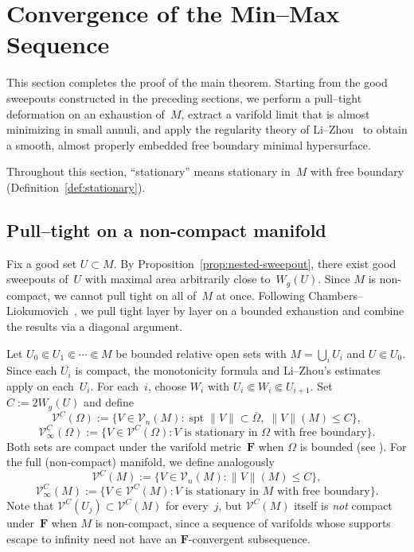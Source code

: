 \section{Convergence of the Min--Max Sequence}\label{ch:convergence-of-min-max}

This section completes the proof of the main theorem. Starting from the good sweepouts constructed in the preceding sections, we perform a pull--tight deformation on an exhaustion of~$M$, extract a varifold limit that is almost minimizing in small annuli, and apply the regularity theory of Li--Zhou~\cite{LZ17} to obtain a smooth, almost properly embedded free boundary minimal hypersurface.

Throughout this section, ``stationary'' means stationary in~$M$ with free boundary (Definition~\ref{def:stationary}).

\subsection{Pull--tight on a non-compact manifold}\label{sec:pull-tight}

Fix a good set $U\subset M$. By Proposition~\ref{prop:nested-sweepout}, there exist good sweepouts of~$U$ with maximal area arbitrarily close to~$W_g(U)$. Since $M$ is non-compact, we cannot pull tight on all of~$M$ at once. Following Chambers--Liokumovich~\cite[\S7]{CL20}, we pull tight layer by layer on a bounded exhaustion and combine the results via a diagonal argument.

Let $U_0\Subset U_1\Subset\cdots\Subset M$ be bounded relative open sets with $M=\bigcup_i U_i$ and $U\Subset U_0$. Since each $\overline{U_i}$ is compact, the monotonicity formula \cite[Theorem~2.1]{LZ17} and Li--Zhou's estimates \cite[Section~3]{LZ17} apply on each~$U_i$. For each~$i$, choose $W_i$ with $U_i\Subset W_i\Subset U_{i+1}$. Set $C:=2W_g(U)$ and define
\[
\mathcal{V}^C(\Omega):=\bigl\{V\in\mathcal{V}_n(M):\operatorname{spt}\|V\|\subset\overline\Omega,\;\|V\|(M)\le C\bigr\},
\]
\[
\mathcal{V}^C_\infty(\Omega):=\bigl\{V\in\mathcal{V}^C(\Omega): V\text{ is stationary in }\Omega\text{ with free boundary}\bigr\}.
\]
Both sets are compact under the varifold metric~$\mathbf{F}$ when $\Omega$ is bounded (see \cite[Lemma~3.4]{LZ17}). For the full (non-compact) manifold, we define analogously
\[
\mathcal{V}^C(M):=\bigl\{V\in\mathcal{V}_n(M): \|V\|(M)\le C\bigr\},
\]
\[
\mathcal{V}^C_\infty(M):=\bigl\{V\in\mathcal{V}^C(M): V\text{ is stationary in }M\text{ with free boundary}\bigr\}.
\]
Note that $\mathcal{V}^C(U_j)\subset\mathcal{V}^C(M)$ for every~$j$, but $\mathcal{V}^C(M)$ itself is \emph{not} compact under~$\mathbf{F}$ when $M$ is non-compact, since a sequence of varifolds whose supports escape to infinity need not have an $\mathbf{F}$-convergent subsequence.

